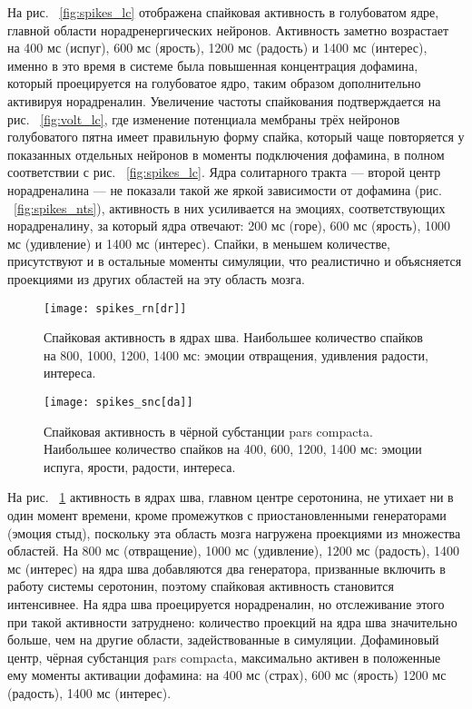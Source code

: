 На рис.  ~\ref{fig:spikes_lc} отображена спайковая активность в голубоватом ядре, главной области норадренергических нейронов. Активность заметно возрастает на 400 мс (испуг), 600 мс (ярость), 1200 мс (радость) и 1400 мс (интерес), именно в это время в системе была повышенная концентрация дофамина, который проецируется на голубоватое ядро, таким образом дополнительно активируя норадреналин. Увеличение частоты спайкования подтверждается на рис. ~\ref{fig:volt_lc}, где изменение потенциала мембраны трёх нейронов голубоватого пятна имеет правильную форму спайка, который чаще повторяется у показанных отдельных нейронов в моменты подключения дофамина, в полном соответствии с рис.  ~\ref{fig:spikes_lc}. Ядра солитарного тракта --- второй центр норадреналина --- не показали такой же яркой зависимости от дофамина (рис. ~\ref{fig:spikes_nts}), активность в них усиливается на эмоциях, соответствующих норадреналину, за который ядра отвечают: 200 мс (горе), 600 мс (ярость), 1000 мс (удивление) и 1400 мс (интерес). Спайки, в меньшем количестве, присутствуют и в остальные моменты симуляции, что реалистично и объясняется проекциями из других областей на эту область мозга.

\begin{figure}
	\centering
	\texttt{[image: spikes\_rn[dr]]}
	\caption{Спайковая активность в ядрах шва. Наибольшее количество спайков на 800, 1000, 1200, 1400 мс: эмоции отвращения, удивления радости, интереса.}
	\label{fig:spikes_rn}
\end{figure}

\begin{figure}
	\centering
	\texttt{[image: spikes\_snc[da]]}
	\caption{Спайковая активность в чёрной субстанции pars compacta. Наибольшее количество спайков на 400, 600, 1200, 1400 мс: эмоции испуга, ярости, радости, интереса.}
	\label{fig:spikes_snc}
\end{figure}

На рис. ~\ref{fig:spikes_rn} активность в ядрах шва, главном центре серотонина, не утихает ни в один момент времени, кроме промежутков с приостановленными генераторами (эмоция стыд), поскольку эта область мозга нагружена проекциями из множества областей. На 800 мс (отвращение), 1000 мс (удивление), 1200 мс (радость), 1400 мс (интерес) на ядра шва добавляются два генератора, призванные включить в работу системы серотонин, поэтому спайковая активность становится интенсивнее. На ядра шва проецируется норадреналин, но отслеживание этого при такой активности затруднено: количество проекций на ядра шва значительно больше, чем на другие области, задействованные в симуляции. Дофаминовый центр, чёрная субстанция pars compacta, максимально активен в положенные ему моменты активации дофамина: на 400 мс (страх), 600 мс (ярость) 1200 мс (радость), 1400 мс (интерес).

